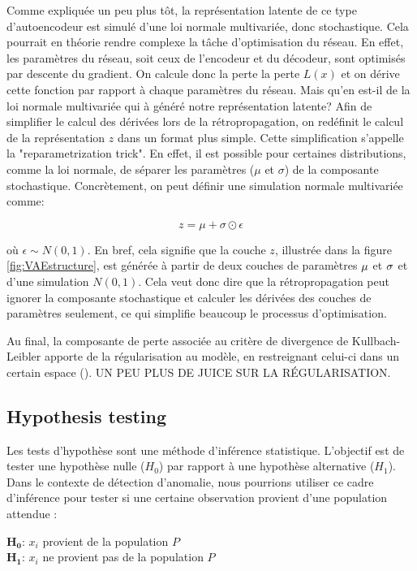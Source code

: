 Comme expliquée un peu plus tôt, la représentation latente de ce type d'autoencodeur est simulé d'une loi normale multivariée, donc stochastique. Cela pourrait en théorie rendre complexe la tâche d'optimisation du réseau. En effet, les paramètres du réseau, soit ceux de l'encodeur et du décodeur, sont optimisés par descente du gradient. On calcule donc la perte la perte $L(x)$ et on dérive cette fonction par rapport à chaque paramètres du réseau. Mais qu'en est-il de la loi normale multivariée qui à généré notre représentation latente? Afin de simplifier le calcul des dérivées lors de la rétropropagation, on redéfinit le calcul de la représentation $z$ dans un format plus simple. Cette simplification s'appelle la "reparametrization trick". En effet, il est possible pour certaines distributions, comme la loi normale, de séparer les paramètres ($\mu$ et $\sigma$)  de la composante stochastique. Concrètement, on peut définir une simulation normale multivariée comme:

$$
z = \mu + \sigma \odot \epsilon
$$

\noindent où $\epsilon \sim N(0,1)$. En bref, cela signifie que la couche $z$, illustrée dans la figure \ref{fig:VAEstructure}, est générée à partir de deux couches de paramètres $\boldmath \mu$ et $\boldmath \sigma$ et d'une simulation $N(0,1)$. Cela veut donc dire que la rétropropagation peut ignorer la composante stochastique et calculer les dérivées des couches de paramètres seulement, ce qui simplifie beaucoup le processus d'optimisation.

Au final, la composante de perte associée au critère de divergence de Kullbach-Leibler apporte de la régularisation au modèle, en restreignant celui-ci dans un certain espace (\cite{kingma2013autoencoding}). UN PEU PLUS DE JUICE SUR LA RÉGULARISATION.


\subsection{Hypothesis testing}

Les tests d'hypothèse sont une méthode d'inférence statistique. L'objectif est de tester une hypothèse nulle ($H_0$) par rapport à une hypothèse alternative ($H_1$). Dans le contexte de détection d'anomalie, nous pourrions utiliser ce cadre d'inférence pour tester si une certaine observation provient d'une population attendue : \newline

\noindent $\boldsymbol{H_0}$: $x_i$ provient de la population $P$ \\
$\boldsymbol{H_1}$: $x_i$ ne provient pas de la population $P$
\newline

